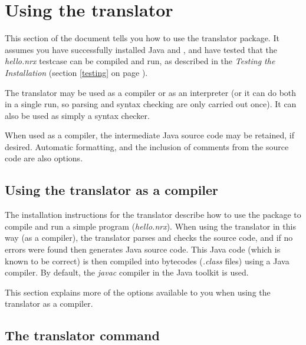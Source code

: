 

\chapter{Using the translator}
This section of the document tells you how to use the
translator package.  It assumes you have successfully installed Java and
\nr{}, and have tested that the \emph{hello.nrx} testcase can be
compiled and run, as described in the \emph{Testing the
\nr{} Installation} (section \ref{testing} on page \pageref{testing}).

The \nr{} translator may be used as a compiler or as an interpreter
(or it can do both in a single run, so parsing and syntax checking are
only carried out once).  It can also be used as simply a syntax checker.

When used as a compiler, the intermediate Java source code may be
retained, if desired.  Automatic formatting, and the inclusion of comments
from the \nr{} source code are also options.

\section{Using the translator as a compiler}
The installation instructions for the \nr{} translator describe how to
use the package to compile and run a simple \nr{} program
(\emph{hello.nrx}).  When using the translator in this way (as a
compiler), the translator parses and checks the \nr{} source code, and
if no errors were found then generates Java source code.  This Java code
(which is known to be correct) is then compiled into bytecodes
(\emph{.class} files) using a Java compiler.  By default,
the \emph{javac} compiler in the Java toolkit is used.

This section explains more of the options available to you when using
the translator as a compiler.
\section{The translator command}

